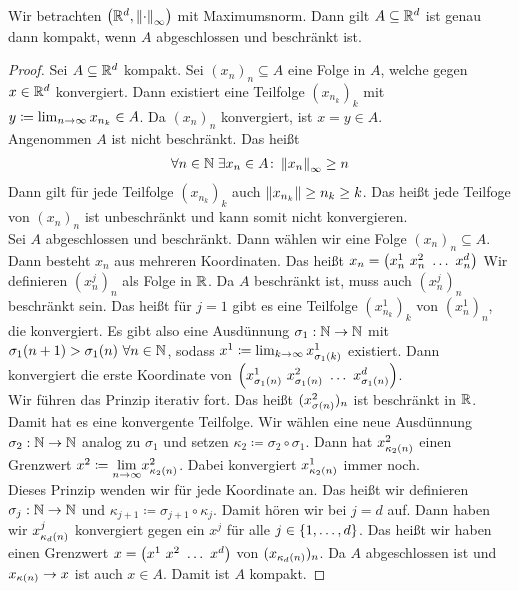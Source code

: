 \begin{satz}
    Wir betrachten $\left(\mathbb{R}^d, \left\lVert\cdot\right\rVert_{\infty}\right)$ mit Maximumsnorm. Dann gilt $A\subseteq \mathbb{R}^d$ ist genau dann kompakt, wenn $A$ abgeschlossen und beschränkt ist.
    \begin{proof}
        \anf{$\impl$} Sei $A\subseteq\mathbb{R}^d$ kompakt. Sei $(x_n)_n \subseteq A$ eine Folge in $A$, welche gegen $x\in\mathbb{R}^d$ konvergiert. Dann existiert eine Teilfolge $(x_{n_k})_k$ mit $y\coloneqq \lim_{n\rightarrow{}\infty} x_{n_k}\in A$. Da $(x_n)_n$ konvergiert, ist $x=y\in A$.\\
        Angenommen $A$ ist nicht beschränkt. Das heißt
        \begin{align*}
            \forall n\in\mathbb{N}\;\exists x_n\in A\colon \left\lVert x_n\right\rVert_{\infty} \geq n
        \end{align*}
        Dann gilt für jede Teilfolge $(x_{n_k})_k$ auch $\left\lVert x_{n_k}\right\rVert \geq n_k \geq k$. Das heißt jede Teilfoge von $(x_n)_n$ ist unbeschränkt und kann somit nicht konvergieren.\\[.5\baselineskip]
        \anf{$\Leftarrow$} Sei $A$ abgeschlossen und beschränkt. Dann wählen wir eine Folge $(x_n)_n\subseteq A$. Dann besteht $x_n$ aus mehreren Koordinaten. Das heißt $x_n = \left(x_n^1~x_n^2~\dots~x_n^d\right)$ Wir definieren $(x_n^j)_n$ als Folge in $\mathbb{R}$. Da $A$ beschränkt ist, muss auch $(x_n^j)_n$ beschränkt sein. Das heißt für $j=1$ gibt es eine Teilfolge $(x_{n_k}^1)_k$ von $(x_n^1)_n$, die konvergiert. Es gibt also eine Ausdünnung $\sigma_1: \mathbb{N}\rightarrow{}\mathbb{N}$ mit $\sigma_1\of{n+1} > \sigma_1\of{n}~\forall n\in\N$, sodass $x^1\coloneqq \lim_{k\toinf} x_{\sigma_{1}\of{k}}^1$ existiert. Dann konvergiert die erste Koordinate von $\pair{x_{\sigma_1\of{n}}^1~x_{\sigma_1\of{n}}^2~\ldots~x_{\sigma_1\of{n}}^d}$.\\
        Wir führen das Prinzip iterativ fort. Das heißt $(x_{\sigma\of{n}}^2)_n$ ist beschränkt in $\mathbb{R}$. Damit hat es eine konvergente Teilfolge. Wir wählen eine neue Ausdünnung $\sigma_2: \mathbb{N}\rightarrow{}\mathbb{N}$ analog zu $\sigma_1$ und setzen $\kappa_2 \coloneqq \sigma_2 \circ \sigma_1$. Dann hat $x^2_{\kappa_2\of{n}}$ einen Grenzwert $x^2\coloneqq \biglim{\ntoinf} x^2_{\kappa_2\of{n}}$. Dabei konvergiert $x_{\kappa_2\of{n}}^1$ immer noch.\\
        Dieses Prinzip wenden wir für jede Koordinate an. Das heißt wir definieren $\sigma_j: \mathbb{N}\rightarrow{}\mathbb{N}$ und $\kappa_{j+1} \coloneqq \sigma_{j+1} \circ \kappa_j$. Damit hören wir bei $j=d$ auf. Dann haben wir $x_{\kappa_d\of{n}}^j$ konvergiert gegen ein $x^j$ für alle $j\in\left\{1, \ldots, d\right\}$. Das heißt wir haben einen Grenzwert $x=\left(x^1~x^2~\dots~x^d\right)$ von $(x_{\kappa_d\of{n}})_n$. Da $A$ abgeschlossen ist und $x_{\kappa\of{n}} \fromto x$ ist auch $x\in A$. Damit ist $A$ kompakt.
    \end{proof}
\end{satz}

